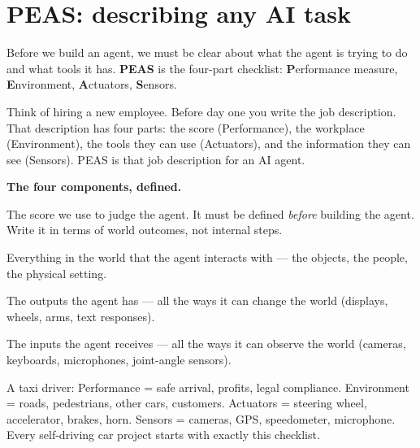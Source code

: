 \documentclass[a4paper,11pt]{article}
\newcommand{\vocab}[1]{\textbf{\color{navy}#1}}
\begin{document}
\section{PEAS: describing any AI task}

Before we build an agent, we must be clear about what the agent is trying to
do and what tools it has.
\vocab{PEAS} is the four-part checklist: \textbf{P}erformance measure,
\textbf{E}nvironment, \textbf{A}ctuators, \textbf{S}ensors.

\begin{intuition}
Think of hiring a new employee. Before day one you write the job description.
That description has four parts: the score (Performance), the workplace
(Environment), the tools they can use (Actuators), and the information they
can see (Sensors). PEAS is that job description for an AI agent.
\end{intuition}

\textbf{The four components, defined.}

\begin{description}[leftmargin=8em,style=nextline,font=\normalfont\bfseries\color{navy}]
  \item[Performance measure] The score we use to judge the agent.
    It must be defined \emph{before} building the agent.
    Write it in terms of world outcomes, not internal steps.
  \item[Environment] Everything in the world that the agent interacts with ---
    the objects, the people, the physical setting.
  \item[Actuators] The outputs the agent has --- all the ways it can change the
    world (displays, wheels, arms, text responses).
  \item[Sensors] The inputs the agent receives --- all the ways it can observe
    the world (cameras, keyboards, microphones, joint-angle sensors).
\end{description}

\begin{everyday}
A taxi driver: Performance = safe arrival, profits, legal compliance.
Environment = roads, pedestrians, other cars, customers.
Actuators = steering wheel, accelerator, brakes, horn.
Sensors = cameras, GPS, speedometer, microphone.
Every self-driving car project starts with exactly this checklist.
\end{everyday}
\end{document}
